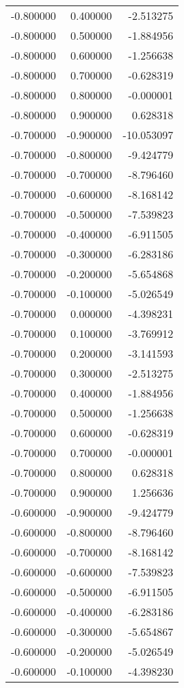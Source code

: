 \begin{tabular}{rrr}
-0.800000 & 0.400000 & -2.513275 \\
-0.800000 & 0.500000 & -1.884956 \\
-0.800000 & 0.600000 & -1.256638 \\
-0.800000 & 0.700000 & -0.628319 \\
-0.800000 & 0.800000 & -0.000001 \\
-0.800000 & 0.900000 & 0.628318 \\
-0.700000 & -0.900000 & -10.053097 \\
-0.700000 & -0.800000 & -9.424779 \\
-0.700000 & -0.700000 & -8.796460 \\
-0.700000 & -0.600000 & -8.168142 \\
-0.700000 & -0.500000 & -7.539823 \\
-0.700000 & -0.400000 & -6.911505 \\
-0.700000 & -0.300000 & -6.283186 \\
-0.700000 & -0.200000 & -5.654868 \\
-0.700000 & -0.100000 & -5.026549 \\
-0.700000 & 0.000000 & -4.398231 \\
-0.700000 & 0.100000 & -3.769912 \\
-0.700000 & 0.200000 & -3.141593 \\
-0.700000 & 0.300000 & -2.513275 \\
-0.700000 & 0.400000 & -1.884956 \\
-0.700000 & 0.500000 & -1.256638 \\
-0.700000 & 0.600000 & -0.628319 \\
-0.700000 & 0.700000 & -0.000001 \\
-0.700000 & 0.800000 & 0.628318 \\
-0.700000 & 0.900000 & 1.256636 \\
-0.600000 & -0.900000 & -9.424779 \\
-0.600000 & -0.800000 & -8.796460 \\
-0.600000 & -0.700000 & -8.168142 \\
-0.600000 & -0.600000 & -7.539823 \\
-0.600000 & -0.500000 & -6.911505 \\
-0.600000 & -0.400000 & -6.283186 \\
-0.600000 & -0.300000 & -5.654867 \\
-0.600000 & -0.200000 & -5.026549 \\
-0.600000 & -0.100000 & -4.398230 \\

\end{tabular}

